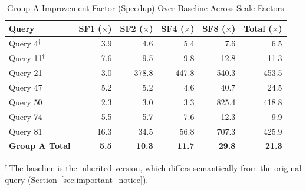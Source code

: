 \documentclass{ULBreport}
\begin{document}
\begin{table}[htbp]
\centering
\caption{Group A Improvement Factor (Speedup) Over Baseline Across Scale Factors}
\label{tab:group_a_results}
\begin{tabular}{@{}lrrrrr@{}}
\toprule
\textbf{Query} & \textbf{SF1 ($\times$)} & \textbf{SF2 ($\times$)} & \textbf{SF4 ($\times$)} & \textbf{SF8 ($\times$)} & \textbf{Total ($\times$)} \\ \midrule
Query 4$^\dagger$ & 3.9 & 4.6 & 5.4 & 7.6 & 6.5 \\
Query 11$^\dagger$ & 7.6 & 9.5 & 9.8 & 12.8 & 11.3 \\
Query 21 & 3.0 & 378.8 & 447.8 & 540.3 & 453.5 \\
Query 47 & 5.2 & 5.2 & 4.6 & 40.7 & 24.5 \\
Query 50 & 2.3 & 3.0 & 3.3 & 825.4 & 418.8 \\
Query 74 & 5.5 & 5.7 & 7.6 & 12.3 & 9.9 \\
Query 81 & 16.3 & 34.5 & 56.8 & 707.3 & 425.9 \\ \midrule
\textbf{Group A Total} & \textbf{5.5} & \textbf{10.3} & \textbf{11.7} & \textbf{29.8} & \textbf{21.3} \\ \bottomrule
\end{tabular}

\smallskip
{\footnotesize $^\dagger$\,The baseline is the inherited version, which differs semantically from the original query (Section~\ref{sec:important_notice}).}
\end{table}
\end{document}
